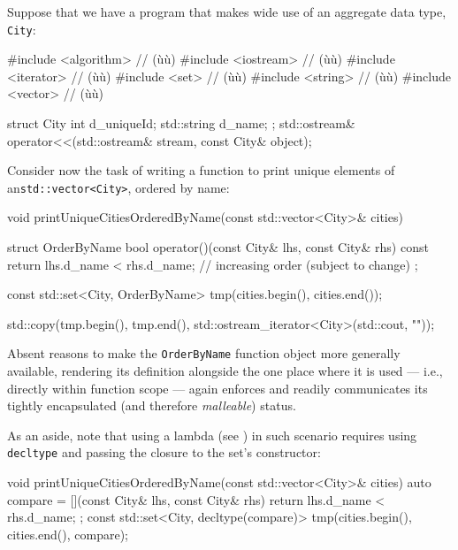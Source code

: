 Suppose that we have a program that makes wide use of an aggregate data
type, \lstinline!City!:

\begin{emcppslisting}[emcppsbatch={e2,e3}]
#include <algorithm>  // (ù{}ù)
#include <iostream>   // (ù{}ù)
#include <iterator>   // (ù{}ù)
#include <set>        // (ù{}ù)       
#include <string>     // (ù{}ù)
#include <vector>     // (ù{}ù)

struct City
{
    int         d_uniqueId;
    std::string d_name;
};
std::ostream& operator<<(std::ostream& stream,
                         const City&   object);
\end{emcppslisting}

\noindent Consider now the task of writing a function to print unique elements of
an\linebreak[4] \lstinline!std::vector<City>!, ordered by name:

\begin{emcppslisting}[emcppsbatch=e2]
void printUniqueCitiesOrderedByName(const std::vector<City>& cities)
{
    struct OrderByName
    {
        bool operator()(const City& lhs, const City& rhs) const
        {
            return lhs.d_name < rhs.d_name;
                // increasing order (subject to change)
        }
    };

    const std::set<City, OrderByName> tmp(cities.begin(), cities.end());

    std::copy(tmp.begin(), tmp.end(),
              std::ostream_iterator<City>(std::cout, "\n"));
}
\end{emcppslisting}

\noindent Absent reasons to make the \lstinline!OrderByName!
function object more generally available, rendering its definition
alongside the one place where it is used --- i.e., directly within
function scope --- again enforces and readily communicates its tightly
encapsulated (and therefore \emph{malleable}) status.

As an aside, note that using a lambda (see ) in such scenario requires using \lstinline!decltype! and passing the closure to the set's constructor:
\begin{emcppslisting}[emcppsbatch=e3]
void printUniqueCitiesOrderedByName(const std::vector<City>& cities)
{
    auto compare = [](const City& lhs, const City& rhs) {
        return lhs.d_name < rhs.d_name;
    };
    const std::set<City, decltype(compare)>
        tmp(cities.begin(), cities.end(), compare);
}
\end{emcppslisting}

